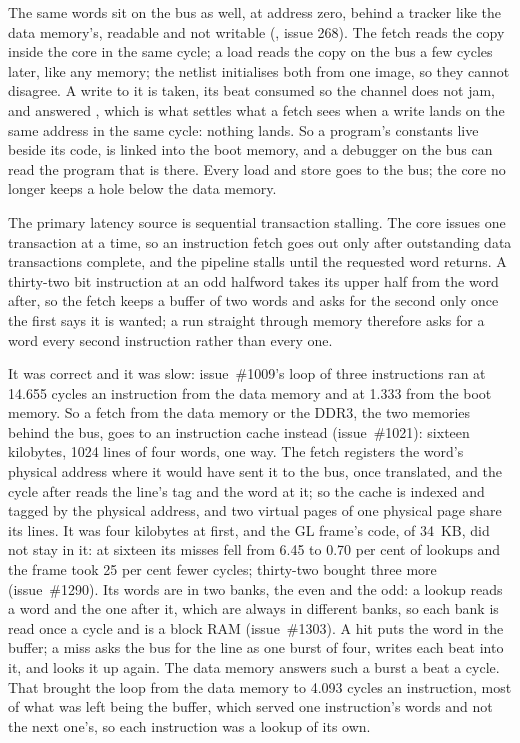 \documentclass[journal,onecolumn,9pt]{IEEEtran}
\begin{document}
The same words sit on the bus as well, at address zero, behind a
tracker like the data memory's, readable and not writable
(, issue 268). The fetch reads the copy inside the
core in the same cycle; a load reads the copy on the bus a few cycles
later, like any memory; the netlist initialises both from one image,
so they cannot disagree. A write to it is taken, its beat consumed so
the channel does not jam, and answered , which is what
settles what a fetch sees when a write lands on the same address in
the same cycle: nothing lands. So a program's constants live beside
its code,  is linked into the boot memory, and a
debugger on the bus can read the program that is there. Every load
and store goes to the bus; the core no longer keeps a hole below the
data memory.

The primary latency source is sequential transaction stalling.
The core issues one transaction at a time, so an instruction fetch goes
out only after outstanding data transactions complete, and the pipeline
stalls until the requested word returns. A thirty-two bit
instruction at an odd halfword takes its upper half from the word
after, so the fetch keeps a buffer of two words and asks for the
second only once the first says it is wanted; a run straight through
memory therefore asks for a word every second instruction rather than
every one.

It was correct and it was slow: issue~\#1009's loop of three
instructions ran at 14.655 cycles an instruction from the data memory
and at 1.333 from the boot memory. So a fetch from the data memory or
the DDR3, the two memories behind the bus, goes to an instruction
cache instead (issue~\#1021): sixteen kilobytes, 1024 lines of four
words, one way. The fetch registers the word's physical address where
it would have sent it to the bus, once translated, and the cycle after
reads the line's tag and the word at it; so the cache is indexed and
tagged by the physical address, and two virtual pages of one physical
page share its lines. It was four kilobytes at first, and the GL
frame's code, of 34~KB, did not stay in it: at sixteen its misses
fell from 6.45 to 0.70 per cent of lookups and the frame took 25 per
cent fewer cycles; thirty-two bought three more (issue~\#1290). Its
words are in two banks, the even and the odd: a lookup reads a word
and the one after it, which are always in different banks, so each
bank is read once a cycle and is a block RAM (issue~\#1303). A hit puts the
word in the buffer; a miss asks the bus for the line as one burst of
four, writes each beat into it, and looks it up again. The data memory
answers such a burst a beat a cycle. That brought the loop from the
data memory to 4.093 cycles an instruction, most of what was left
being the buffer, which served one instruction's words and not the
next one's, so each instruction was a lookup of its own.
\end{document}
